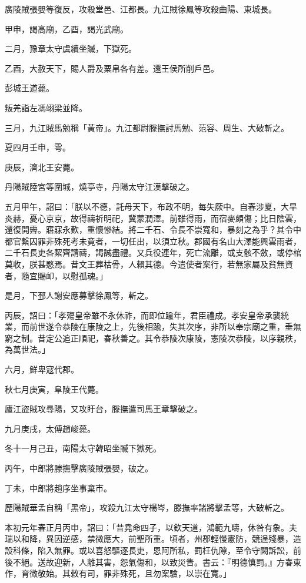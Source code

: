 \begin{pinyinscope}
廣陵賊張嬰等復反，攻殺堂邑、江都長。九江賊徐鳳等攻殺曲陽、東城長。

甲申，謁高廟，乙酉，謁光武廟。

二月，豫章太守虞續坐贓，下獄死。

乙酉，大赦天下，賜人爵及粟帛各有差。還王侯所削戶邑。

彭城王道薨。

叛羌詣左馮翊梁並降。

三月，九江賊馬勉稱「黃帝」。九江都尉滕撫討馬勉、范容、周生、大破斬之。

夏四月壬申，雩。

庚辰，濟北王安薨。

丹陽賊陸宮等圍城，燒亭寺，丹陽太守江漢擊破之。

五月甲午，詔曰：「朕以不德，託母天下，布政不明，每失厥中。自春涉夏，大旱炎赫，憂心京京，故得禱祈明祀，冀蒙潤澤。前雖得雨，而宿麥頗傷；比日陰雲，還復開霽。寤寐永歎，重懷慘結。將二千石、令長不崇寬和，暴刻之為乎？其令中都官繫囚罪非殊死考未竟者，一切任出，以須立秋。郡國有名山大澤能興雲雨者，二千石長吏各絜齊請禱，謁誠盡禮。又兵役連年，死亡流離，或支骸不斂，或停棺莫收，朕甚愍焉。昔文王葬枯骨，人賴其德。今遣使者案行，若無家屬及貧無資者，隨宜賜卹，以慰孤魂。」

是月，下邳人謝安應募擊徐鳳等，斬之。

丙辰，詔曰：「孝殤皇帝雖不永休祚，而即位踰年，君臣禮成。孝安皇帝承襲統業，而前世遂令恭陵在康陵之上，先後相踰，失其次序，非所以奉宗廟之重，垂無窮之制。昔定公追正順祀，春秋善之。其令恭陵次康陵，憲陵次恭陵，以序親秩，為萬世法。」

六月，鮮卑寇代郡。

秋七月庚寅，阜陵王代薨。

廬江盜賊攻尋陽，又攻盱台，滕撫遣司馬王章擊破之。

九月庚戌，太傅趙峻薨。

冬十一月己丑，南陽太守韓昭坐贓下獄死。

丙午，中郎將滕撫擊廣陵賊張嬰，破之。

丁未，中郎將趙序坐事棄巿。

歷陽賊華孟自稱「黑帝」，攻殺九江太守楊岑，滕撫率諸將擊孟等，大破斬之。

本初元年春正月丙申，詔曰：「昔堯命四子，以欽天道，鴻範九疇，休咎有象。夫瑞以和降，異因逆感，禁微應大，前聖所重。頃者，州郡輕慢憲防，競逞殘暴，造設科條，陷入無罪。或以喜怒驅逐長吏，恩阿所私，罰枉仇隙，至令守闕訴訟，前後不絕。送故迎新，人離其害，怨氣傷和，以致災眚。書云：『明德慎罰。』方春東作，育微敬始。其敕有司，罪非殊死，且勿案驗，以崇在寬。」


\end{pinyinscope}

